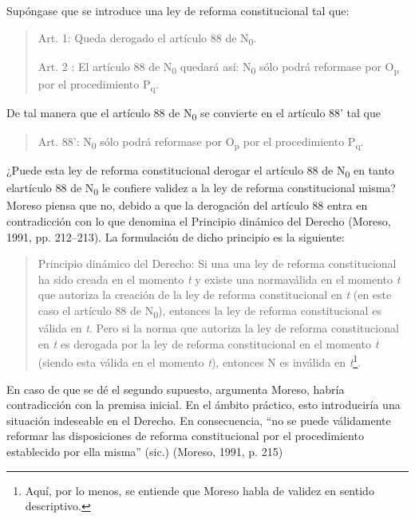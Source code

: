 \documentclass[]{book}
\begin{document}
\begin{refsection}
Supóngase que se introduce una ley de reforma constitucional tal que:

\begin{quote}
Art. 1: Queda derogado el artículo 88 de N\textsubscript{0}.

Art. 2 : El artículo 88 de N\textsubscript{0} quedará así:
N\textsubscript{0} sólo podrá reformase por O\textsubscript{p} por el
procedimiento P\textsubscript{q}.
\end{quote}

De tal manera que el artículo 88 de N\textsubscript{0} se convierte en
el artículo 88' tal que

\begin{quote}
Art. 88': N\textsubscript{0} sólo podrá reformase por O\textsubscript{p}
por el procedimiento P\textsubscript{q}.
\end{quote}

¿Puede esta ley de reforma constitucional derogar el artículo 88 de N\textsubscript{0} en tanto elartículo 88 de N\textsubscript{0} le confiere validez a la ley de reforma constitucional misma? Moreso piensa que no, debido a que la derogación del artículo 88 entra en contradicción con lo que denomina el Principio dinámico del Derecho (Moreso, 1991, pp. 212--213). La formulación de dicho principio es
la siguiente:

\begin{quote}
Principio dinámico del Derecho: Si una una ley de reforma constitucional ha sido creada en el momento \emph{t} y existe una normaválida en el momento \emph{t} que autoriza la creación de la ley de reforma constitucional en \emph{t}
(en este caso el artículo 88 de N\textsubscript{0}), entonces la ley de reforma constitucional es
válida en \emph{t}. Pero si la norma que autoriza la ley de reforma constitucional en \emph{t} es
derogada por la ley de reforma constitucional en el momento \emph{t} (siendo esta válida en el momento
\emph{t}), entonces N es inválida en \emph{t}\footnote{Aquí, por lo
  menos, se entiende que Moreso habla de validez en sentido descriptivo.}.
\end{quote}

En caso de que se dé el segundo supuesto, argumenta Moreso, habría
contradicción con la premisa inicial. En el ámbito práctico, esto
introduciría una situación indeseable en el Derecho. En consecuencia,
``no se puede válidamente reformar las disposiciones de reforma
constitucional por el procedimiento establecido por ella misma'' (sic.)
(Moreso, 1991, p. 215)


\end{refsection}
\end{document}
